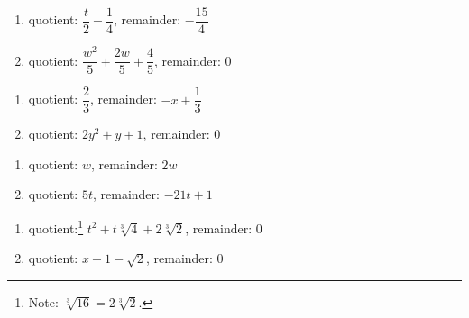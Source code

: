 \documentclass{ximera}
\begin{document}
\begin{multicols}{2}
\begin{enumerate}
\setcounter{enumi}{\value{HW}}

\item quotient: $\dfrac{t}{2} - \dfrac{1}{4}$, remainder: $-\dfrac{15}{4}$ 

\item quotient: $\dfrac{w^2}{5} + \dfrac{2w}{5} + \dfrac{4}{5}$, remainder: $0$

\setcounter{HW}{\value{enumi}}
\end{enumerate}
\end{multicols}

\begin{multicols}{2}
\begin{enumerate}
\setcounter{enumi}{\value{HW}}

\item quotient: $\dfrac{2}{3}$, remainder: $-x + \dfrac{1}{3}$

\item quotient:  $2y^2+y+1$, remainder: $0$ 

\setcounter{HW}{\value{enumi}}
\end{enumerate}
\end{multicols}

\begin{multicols}{2}
\begin{enumerate}
\setcounter{enumi}{\value{HW}}

\item quotient: $w$, remainder: $2w$
\item quotient: $5t$, remainder: $-21t + 1$


\setcounter{HW}{\value{enumi}}
\end{enumerate}
\end{multicols}

\begin{multicols}{2}
\begin{enumerate}
\setcounter{enumi}{\value{HW}}
\item quotient:\footnote{Note: $\sqrt[3]{16} = 2\sqrt[3]{2}$.} $t^2 + t \sqrt[3]{4} + 2\sqrt[3]{2}$, remainder: $0$

\item quotient: $x -1 - \sqrt{2}$, remainder: 0  
\setcounter{HW}{\value{enumi}}
\end{enumerate}
\end{multicols}
\end{document}

